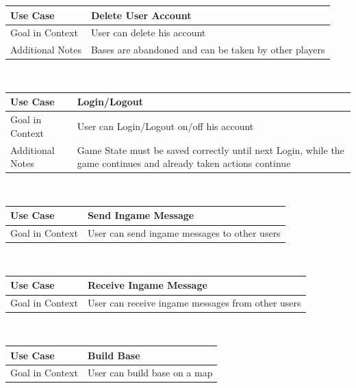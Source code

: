 \documentclass[a4paper]{article}
\begin{document}
\begin{tabular}[t]{|l|l|l|}
\hline
\textbf{Use Case}	&	\multicolumn{2}{|l|}{\textbf{Delete User Account}}\\
\hline
Goal in Context	&	\multicolumn{2}{|l|}{User can delete his account}\\
\hline
Additional Notes	&	\multicolumn{2}{|l|}{Bases are abandoned and can be taken by other players}\\
\hline
\end{tabular}\\

\begin{tabular}[t]{|l|l|p{7cm}|}
\hline
\textbf{Use Case}	&	\multicolumn{2}{|p{7cm}|}{\textbf{Login/Logout}}\\
\hline
Goal in Context	&	\multicolumn{2}{|p{7cm}|}{User can Login/Logout on/off his account}\\
\hline
Additional Notes	&	\multicolumn{2}{|p{10cm}|}{Game State must be saved correctly until next Login, while the game continues and already taken actions continue}\\
\hline
\end{tabular}\\

\begin{tabular}[t]{|l|l|l|}
\hline
\textbf{Use Case}	&	\multicolumn{2}{|l|}{\textbf{Send Ingame Message}}\\
\hline
Goal in Context	&	\multicolumn{2}{|l|}{User can send ingame messages to other users}\\
\hline
\end{tabular}\\

\begin{tabular}[t]{|l|l|l|}
\hline
\textbf{Use Case}	&	\multicolumn{2}{|l|}{\textbf{Receive Ingame Message}}\\
\hline
Goal in Context	&	\multicolumn{2}{|l|}{User can receive ingame messages from other users}\\
\hline
\end{tabular}\\

\begin{tabular}[t]{|l|l|l|}
\hline
\textbf{Use Case}	&	\multicolumn{2}{|l|}{\textbf{Build Base}}\\
\hline
Goal in Context	&	\multicolumn{2}{|l|}{User can build base on a map}\\
\hline
\end{tabular}\\
\end{document}
